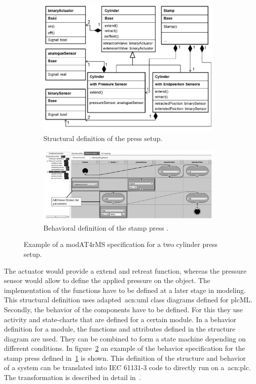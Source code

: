 \begin{figure}
	\begin{subfigure}{\textwidth}
		\includegraphics[width=\textwidth]{./Figures/modAT4rMS_struct.png}
		\caption{Structural definition of the press setup.}
		\label{fig:modAT_struct}
	\end{subfigure}
	\begin{subfigure}{\textwidth}
		\includegraphics[width=\textwidth]{./Figures/modAT4rMS_beh.png}
		\caption{Behavioral definition of the stamp press .}
		\label{fig:modAT_beh}
	\end{subfigure}
	\caption[Example of a modAT4rMS specification for a two cylinder press setup.]{Example of a modAT4rMS specification for a two cylinder press setup.~\cite{Obermeier:2015aa}}
	\label{fig:modAT}
\end{figure}
The actuator would provide a extend and retreat function, whereas the pressure sensor would allow to define the applied pressure on the object.
The implementation of the functions have to be defined at a later stage in modeling.
This structural definition uses adapted~\acrshort{acn:uml} class diagrams defined for plcML.
Secondly, the behavior of the components have to be defined.
For this they use activity and state-charts that are defined for a certain module.
In a behavior definition for a module, the functions and attributes defined in the structure diagram are used.
They can be combined to form a state machine depending on different conditions.
In figure~\ref{fig:modAT_beh} an example of the behavior specification for the stamp press defined in~\ref{fig:modAT_struct} is shown.
This definition of the structure and behavior of a system can be translated into IEC 61131-3 code to directly run on a~\acrshort{acn:plc}.
The transformation is described in detail in~\cite{WITSCH2015}.

